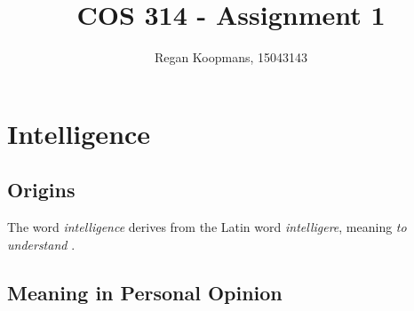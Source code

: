 \documentclass[10pt,a4paper]{article}
\author{Regan Koopmans, 15043143}
\title{COS 314 - Assignment 1 }
\begin{document}
		
	\maketitle
		
		\section{Intelligence}
			\subsection{Origins}
				The word \textsl{intelligence} derives from the Latin word \textsl{intelligere}, meaning \textsl{to understand} \cite{etymonline2017}.
		
			\subsection{Meaning in Personal Opinion}
		
\end{document}
